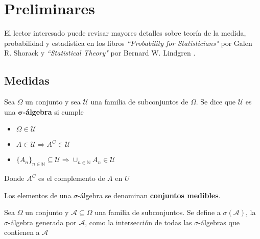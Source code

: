 
\chapter{Preliminares}

El lector interesado puede revisar mayores detalles sobre teoría de la medida, probabilidad y estadística en los libros \textit{``Probability for Statisticians"} por Galen R. Shorack \cite{probabilidad_shorack} y \textit{``Statistical Theory"} por Bernard W. Lindgren \cite{estadistica_lindgren}.


\section{Medidas}

\begin{definicion}%
Sea $\Omega$ un conjunto y sea $\mathcal{U}$ una familia de subconjuntos de $\Omega$. Se dice que 
$\mathcal{U}$ es una \textbf{$\boldsymbol{\sigma}$-álgebra} si cumple
\begin{itemize}
\item $\Omega \in \mathcal{U}$
\item $A \in \mathcal{U} \Rightarrow A^{C} \in \mathcal{U}$
\item 
$ \displaystyle \{ A_n \}_{n\in \mathbb{N}} \subseteq \mathcal{U} 
\Rightarrow \cup_{n\in \mathbb{N}} A_n \in \mathcal{U}$
\end{itemize}
Donde $A^{C}$ es el complemento de $A$ en $U$
\end{definicion}

Los elementos de una $\sigma$-álgebra se denominan \textbf{conjuntos medibles}. 

\begin{definicion}
Sea $\Omega$ un conjunto y $\mathcal{A} \subseteq \Omega$ una familia de subconjuntos. Se define a $\sigma(\mathcal{A})$, la $\sigma$-álgebra generada por $\mathcal{A}$, como la intersección de todas las $\sigma$-álgebras que contienen a $\mathcal{A}$  
\end{definicion}

